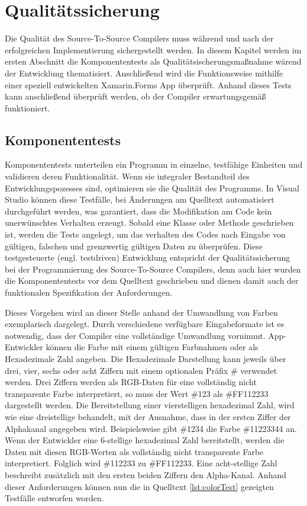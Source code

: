 \chapter{Qualitätssicherung}
\label{chap:Qualitätssicherung}
Die Qualität des Source-To-Source Compilers muss während und nach der erfolgreichen Implementierung sichergestellt werden. In diesem Kapitel werden im ersten Abschnitt die Komponententests als Qualitätsischerungsmaßnahme wärend der Entwicklung thematisiert.  Anschließend wird die Funktionsweise mithilfe einer speziell entwickelten Xamarin.Forms App überprüft.  Anhand dieses Tests kann anschließend überprüft werden, ob  der Compiler erwartungsgemäß funktioniert. 

\section{Komponententests}
Komponententests unterteilen ein Programm in einzelne,  testfähige Einheiten und validieren deren Funktionalität.  Wenn sie integraler Bestandteil des Entwicklungspozesses sind,  optimieren sie die Qualität des Programms. 
In Visual Studio können diese Testfälle, bei Änderungen am Quelltext automatisiert durchgeführt 
werden, was garantiert, dass die Modifikation am Code kein unerwünschtes Verhalten erzeugt.   Sobald eine Klasse oder Methode geschrieben ist, werden die Tests angelegt,  um das verhalten des Codes nach Eingabe von gültigen,  falschen und grenzwertig gültigen Daten zu überprüfen.
Diese testgesteuerte (engl. testdriven) Entwicklung entspricht der Qualitätssicherung bei 
der Programmierung des Source-To-Source Compilers, denn auch hier wurden die Komponententests vor dem Quelltext geschrieben und dienen damit auch der funktionalen Spezifikation der Anforderungen.

Dieses Vorgehen wird an dieser Stelle anhand der Umwandlung von Farben exemplarisch dargelegt.  Durch verschiedene verfügbare Eingabeformate ist es notwendig,  dass der Compiler eine vollständige Umwandlung vornimmt.  App-Entwickler können die Farbe mit einem gültigen Farbnahmen oder als Hexadezimale Zahl angeben.  Die Hexadezimale Darstellung kann jeweils über drei, vier,  sechs oder acht Ziffern mit einem optionalen Präfix \# verwendet werden.  Drei Ziffern werden als RGB-Daten für eine vollständig nicht transparente Farbe interpretiert,  so muss der Wert \#123 als \#FF112233 dargestellt werden.  Die Bereitstellung einer vierstelligen hexadezimal Zahl, wird wie eine dreistellige behandelt,  mit der Ausnahme, dass in der ersten Ziffer der Alphakanal angegeben wird.  Beispielsweise gibt \#1234 die Farbe \#11223344 an.  Wenn der Entwickler eine 6-stellige hexadezimal Zahl bereitstellt, werden die Daten mit diesen RGB-Werten als vollständig nicht transparente Farbe interpretiert.  Folglich wird \#112233 zu \#FF112233. Eine acht-stellige Zahl beschreibt zusätzlich mit den ersten beiden Ziffern den Alpha-Kanal.  
Anhand dieser Anforderungen können nun die in Quelltext \ref{lst:colorTest} gezeigten Testfälle entworfen worden.

